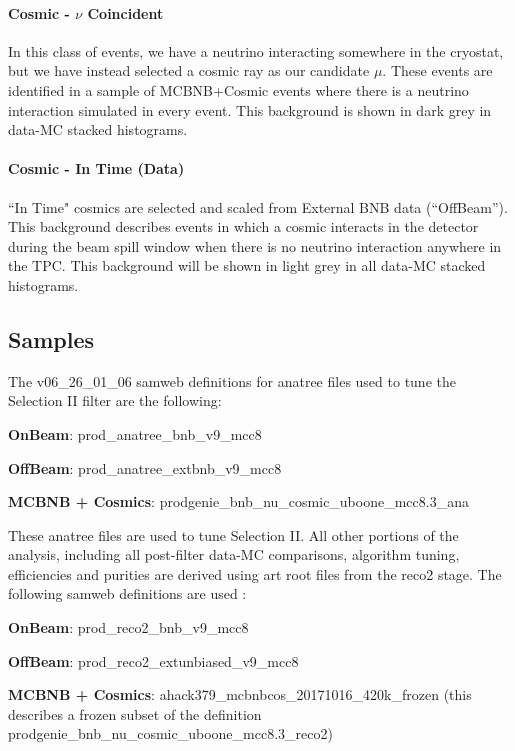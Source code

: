\documentclass{article}
\begin{document}
\paragraph{ Cosmic - $\nu$ Coincident }
In this class of events, we have a neutrino interacting somewhere in the cryostat, but we have instead selected a cosmic ray as our candidate $\mu$. These events are identified in a sample of MCBNB+Cosmic events where there is a neutrino interaction simulated in every event. This background is shown in dark grey in data-MC stacked histograms.  

\paragraph{Cosmic - In Time (Data) }
``In Time" cosmics are selected and scaled from External BNB data (``OffBeam'').  This background describes events in which a cosmic interacts in the detector during the beam spill window when there is no neutrino interaction anywhere in the TPC.  This background will be shown in light grey in all data-MC stacked histograms.

\subsection{Samples}
The v06\_26\_01\_06 samweb definitions for anatree files used to tune the Selection II filter are the following: 

\par \textbf{OnBeam}: prod\_anatree\_bnb\_v9\_mcc8
\par \textbf{OffBeam}: prod\_anatree\_extbnb\_v9\_mcc8
\par \textbf{MCBNB + Cosmics}: prodgenie\_bnb\_nu\_cosmic\_uboone\_mcc8.3\_ana

\noindent These anatree files are used to tune Selection II. All other portions of the analysis, including all post-filter data-MC comparisons, algorithm tuning, efficiencies and purities are derived  using art root files from the reco2 stage.  The following samweb definitions are used : 
\par \textbf{OnBeam}: prod\_reco2\_bnb\_v9\_mcc8
\par \textbf{OffBeam}: prod\_reco2\_extunbiased\_v9\_mcc8
\par \textbf{MCBNB + Cosmics}: ahack379\_mcbnbcos\_20171016\_420k\_frozen (this describes a frozen subset of the definition prodgenie\_bnb\_nu\_cosmic\_uboone\_mcc8.3\_reco2) \\
\end{document}
